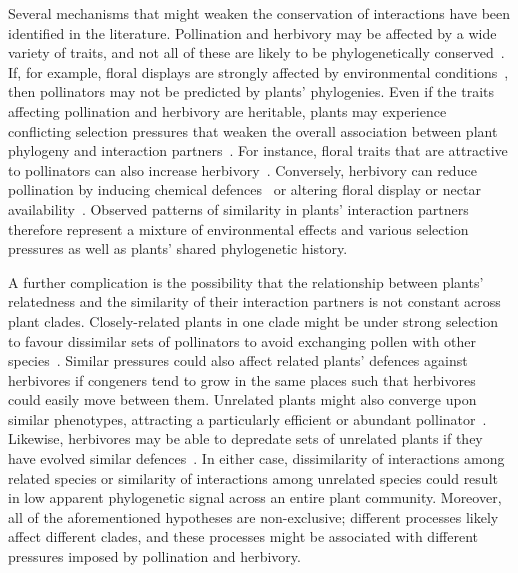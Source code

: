 \documentclass[12pt]{article}
\begin{document}
\begin{spacing}{1.5}
  Several mechanisms that might weaken the conservation of interactions
  have been identified in the literature. Pollination and herbivory may be affected
  by a wide variety of traits, and not all of these are likely to be
  phylogenetically conserved~\citep{Rezende2007,Kursar2009}. If, for example,
  floral displays are strongly affected by environmental conditions~\citep{Canto2004}, 
  then pollinators may not be predicted by plants' phylogenies.
  Even if the traits affecting pollination and herbivory are
  heritable, plants may experience conflicting selection pressures that
  weaken the overall association between plant phylogeny and interaction
  partners~\citep{Armbruster1997,Lankau2007,Siepielski2010,Wise2013}. 
  For instance, floral traits that
  are attractive to pollinators can also increase 
  herbivory~\citep{Strauss2002,Adler2004,Theis2006}. 
  Conversely, herbivory can reduce pollination by inducing chemical 
  defences~\citep{Adler2006} or altering floral display or nectar 
  availability~\citep{Strauss1997}. Observed patterns
  of similarity in plants' interaction partners therefore represent
  a mixture of environmental effects and various selection pressures as
  well as plants' shared phylogenetic history.


  A further complication is the possibility that the relationship between
  plants' relatedness and the similarity of their interaction partners is
  not constant across plant clades. Closely-related plants
  in one clade might be under strong selection to favour dissimilar
  sets of pollinators to avoid exchanging pollen with other
  species~\citep{Levin1970,Bell2005,Mitchell2009}. Similar pressures 
  could also affect related plants' defences against herbivores if 
  congeners tend to grow in the same places such that herbivores 
  could easily move between them.  Unrelated plants might also 
  converge upon similar phenotypes, attracting a particularly 
  efficient or abundant pollinator~\citep{Ollerton1996,Ollerton2009}. 
  Likewise, herbivores may be able to depredate sets of unrelated 
  plants if they have evolved similar defences~\citep{Pichersky2000}. 
  In either case, dissimilarity of interactions among related species 
  or similarity of interactions among unrelated species could result 
  in low apparent phylogenetic signal across an entire plant community. 
  Moreover, all of the aforementioned hypotheses 
  are non-exclusive; different processes likely affect different
  clades, and these processes might be associated with different 
  pressures imposed by pollination and herbivory. 



\end{spacing}
\end{document}

